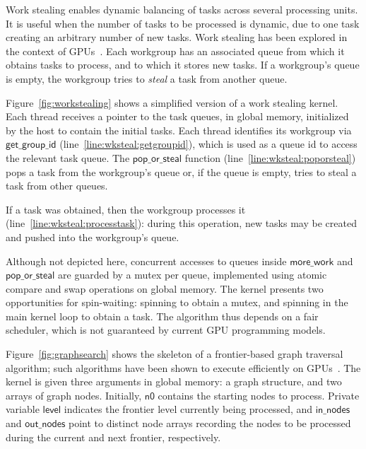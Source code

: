 \documentclass[parskip=half,sigconf,review, anonymous=true, acmcopyrightmode=none]{acmart}
\newcommand{\myfiglong}{Figure~}
\newcommand{\getgroupid}{\mathsf{get\_group\_id}}
\newcommand{\keyword}[1]{\mathsf{#1}}
\begin{document}
%
Work stealing enables dynamic balancing of tasks across several
processing units. It is useful when the number of tasks to be
processed is dynamic, due to one task creating an arbitrary number of
new tasks.  Work stealing has been explored in the context of
GPUs~\cite{DBLP:conf/egh/CedermanT08,TPO10}. Each workgroup has an
associated queue from which it obtains tasks to process, and to which
it stores new tasks. If a workgroup's queue is empty, the workgroup
tries to \emph{steal} a task from another queue.

\myfiglong\ref{fig:workstealing} shows a simplified version of a work
stealing kernel. Each thread receives a pointer to the
task queues, in global memory, initialized by the
host to contain the initial tasks. Each thread identifies
its workgroup via $\getgroupid$
(line~\ref{line:wksteal:getgroupid}), which is used as a queue id to access the relevant task queue. The
$\mathsf{pop\_or\_steal}$ function (line~\ref{line:wksteal:poporsteal})
pops a task from the workgroup's queue or, if the queue is empty,
tries to steal a task from other queues.


If a task was obtained, then the workgroup processes it
(line~\ref{line:wksteal:processtask}): during this operation, new tasks
may be created and pushed into the workgroup's queue.

Although not depicted here, concurrent accesses to queues inside
$\mathsf{more\_work}$ and $\mathsf{pop\_or\_steal}$ are guarded by a
mutex per queue, implemented using atomic compare and swap operations
on global memory.  The kernel presents two opportunities
for spin-waiting: spinning to obtain a mutex, and spinning in the main
kernel loop to obtain a task.  The algorithm thus depends
on a fair scheduler, which is not guaranteed by current GPU programming models.

 \myfiglong\ref{fig:graphsearch} shows the
skeleton of a frontier-based graph traversal algorithm; such algorithms have
been shown to execute efficiently on GPUs~\cite{BNP12,DBLP:conf/oopsla/PaiP16}.
The kernel is
given three arguments in global memory: a graph structure, and two
arrays of graph nodes. Initially, $\keyword{n0}$ contains the
starting nodes to process. Private variable $\keyword{level}$ indicates the frontier level currently being
processed, and $\keyword{in\_nodes}$ and $\keyword{out\_nodes}$ point to
distinct node arrays recording the nodes to be processed during the current and next frontier, respectively.
\end{document}
